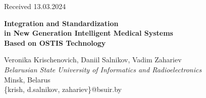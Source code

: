 \documentclass[10pt, a4paper]{article}
\begin{document}
\begin{multicols}{2}
\begin{flushright}
    \par
    \par Received 13.03.2024
\end{flushright}

\clearpage

\end{multicols}
\setlength{\parindent}{0.3cm}
\fontsize{10}{15}\selectfont
{}
\begin{center}
\fontsize{22}{30}\selectfont
\textbf{Integration and Standardization
\\
in New Generation Intelligent Medical Systems 
\\
Based on OSTIS Technology}
\end{center}
\setlength{\parindent}{0.8cm}
\par
\setlength{\parindent}{0.3cm}
\begin{center}
\fontsize{10}{13}\selectfont
Veronika Krischenovich, Daniil Salnikov, Vadim Zahariev
\\
\textit{Belarusian State University of Informatics and Radioelectronics}
\\
Minsk, Belarus
\\
\{krish, d.salnikov, zahariev\}@bsuir.by
\end{center}
\end{document}
